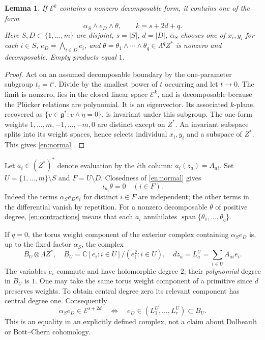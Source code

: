 \documentclass[12pt]{amsart}
\newtheorem{lem}[thm]{Lemma}
\theoremstyle{definition}
\theoremstyle{remark}
\numberwithin{equation}{section}
\newcommand{\C}{\mathbb{C}}
\newcommand{\gfr}{\mathfrak g}
\newcommand{\Eex}{\mathcal E}
\newcommand{\Span}{\operatorname{span}}
\begin{document}
\begin{lem}\label{en:fixed}
If $\Eex^k$ contains a nonzero decomposable form, it contains one of the
form
\begin{equation}\label{en:normal}
 \alpha_S\wedge e_D\wedge\theta,
 \qquad k=s+2d+q.
\end{equation}
Here $S,D\subset\{1,\ldots,m\}$ are disjoint, $s=|S|$, $d=|D|$,
$\alpha_S$ chooses one of $x_i,y_i$ for each $i\in S$,
$e_D=\bigwedge_{i\in D}e_i$, and
$\theta=\theta_1\wedge\cdots\wedge\theta_q\in\Lambda^q Z^*$ is nonzero
and decomposable. Empty products equal $1$.
\end{lem}
\begin{proof}
Act on an assumed decomposable boundary by the one-parameter subgroup
$t_i=t^i$. Divide by the smallest power of $t$ occurring and let $t\to0$.
The limit is nonzero, lies in the closed linear space $\Eex^k$, and is
decomposable because the Pl\"ucker relations are polynomial. It is an
eigenvector. Its associated $k$-plane, recovered as
$\{v\in\gfr^*:v\wedge\eta=0\}$, is invariant under this subgroup.
The one-form weights $1,\ldots,m,-1,\ldots,-m,0$ are distinct except
on $Z^*$. An invariant subspace splits into its weight spaces, hence
selects individual $x_i,y_i$ and a subspace of $Z^*$. This gives
\eqref{en:normal}.
\end{proof}

Let $a_i\in(Z^*)^*$ denote evaluation by the $i$th column:
$a_i(z_a)=A_{ai}$. Set $U=\{1,\ldots,m\}\setminus S$ and $F=U\setminus D$.
Closedness of \eqref{en:normal} gives
\begin{equation}\label{en:contractions}
 \iota_{a_i}\theta=0\quad(i\in F).
\end{equation}
Indeed the terms $\alpha_S e_D e_i$ for distinct $i\in F$ are independent;
the other terms in the differential vanish by repetition.
For a nonzero decomposable $\theta$ of positive degree,
\eqref{en:contractions} means that each $a_i$ annihilates
$\Span\{\theta_1,\ldots,\theta_q\}$.

If $q=0$, the torus weight component of the exterior complex containing
$\alpha_S e_D$ is, up to the fixed factor $\alpha_S$, the complex
\begin{equation}\label{en:boolean}
 B_U\otimes\Lambda Z^*,\quad
 B_U=\C[e_i:i\in U]/(e_i^2:i\in U),\quad
 d z_a=L_a^U=\sum_{i\in U}A_{ai}e_i.
\end{equation}
The variables $e_i$ commute and have holomorphic degree $2$; their
\emph{polynomial} degree in $B_U$ is $1$.
One may take the same torus weight component of a primitive since $d$
preserves weights. To obtain central degree zero its relevant component
has central degree one. Consequently
\begin{equation}\label{en:ideal}
 \alpha_S e_D\in\Eex^{s+2d}
 \quad\Longleftrightarrow\quad
 e_D\in(L_1^U,\ldots,L_r^U)\subset B_U.
\end{equation}
This is an equality in an explicitly defined complex, not a claim about
Dolbeault or Bott--Chern cohomology.
\end{document}
